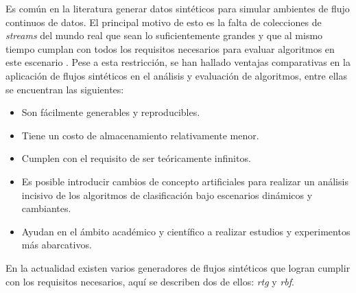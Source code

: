 Es común en la literatura generar datos sintéticos para simular ambientes de
flujo continuos de datos. El principal motivo de esto es la falta de colecciones
de \textit{streams} del mundo real que sean lo suficientemente grandes y que al
mismo tiempo cumplan con todos los requisitos necesarios para evaluar algoritmos
en este escenario \cite{kirkby_improving_2007}. Pese a esta restricción, se han
hallado ventajas comparativas en la aplicación de flujos sintéticos en el
análisis y evaluación de algoritmos, entre ellas se encuentran las siguientes:

\begin{itemize} 

   \item Son fácilmente generables y reproducibles.

   \item Tiene un costo de almacenamiento relativamente menor.

   \item Cumplen con el requisito de ser teóricamente infinitos.

   \item Es posible introducir cambios de concepto artificiales para realizar un
      análisis incisivo de los algoritmos de clasificación bajo escenarios
      dinámicos y cambiantes.

   \item Ayudan en el ámbito académico y científico a realizar estudios y
      experimentos más abarcativos.

\end{itemize} 

En la actualidad existen varios generadores de flujos sintéticos que logran
cumplir con los requisitos necesarios, aquí se describen dos de ellos:
\textit{\acrfull{rtg}} y \textit{\acrfull{rbf}}.

